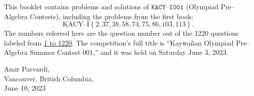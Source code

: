 \documentclass[12pt,a4paper]{memoir}
\theoremstyle{definition}
\begin{document}
		This booklet contains problems and solutions of $\texttt{KACY--I001}$ (Olympiad Pre--Algebra Contests), including the problems from the first book: $$\text{KACY--I}\left\{2,37,38,58,74,75,86,103,113\right\}.$$ The numbers referred here are the question number out of the 1220 questions labeled from \href{https://github.com/parvardi/KACY/blob/main/KACY-VOL-I.pdf}{1 to 1220}. The competition's full title is ``Kaywañan Olympiad Pre--Algebra Summer Contest 001,'' and it was held on Saturday June 3, 2023.
%	
\Large
		\begin{flushright}
			Amir Parvardi,\\
			Vancouver, British Columbia,\\
			June 10, 2023
		\end{flushright}
	
\end{document}
